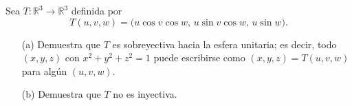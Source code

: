Sea \( T : \mathbb{R}^3 \to \mathbb{R}^3 \) definida por
\[
T(u, v, w) = \big(u \cos v \cos w, \, u \sin v \cos w, \, u \sin w\big).
\]

\begin{enumerate}
    \item[(a)] Demuestra que \( T \) es sobreyectiva hacia la esfera unitaria; es decir, todo \( (x, y, z) \) con \( x^2 + y^2 + z^2 = 1 \) puede escribirse como \( (x, y, z) = T(u, v, w) \) para algún \( (u, v, w) \).
    \item[(b)] Demuestra que \( T \) no es inyectiva.
\end{enumerate}

